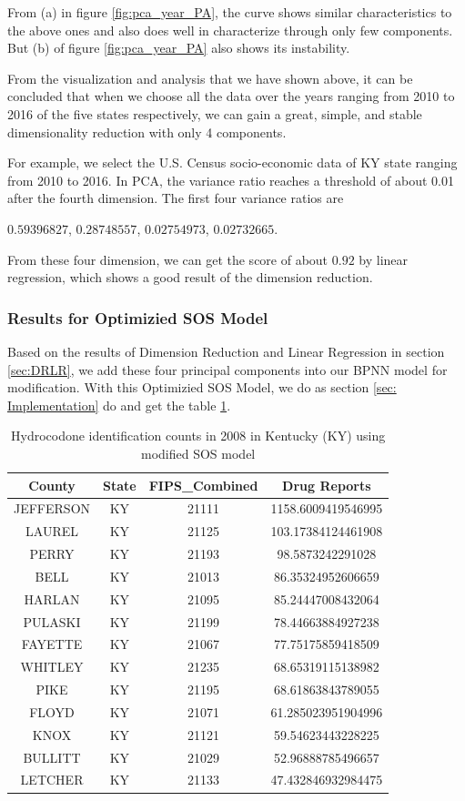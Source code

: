 \documentclass{mcmthesis}
\begin{document}
From (a) in figure \ref{fig:pca_year_PA}, the curve shows similar characteristics to the above ones and also does well in characterize through only few components. But (b) of figure \ref{fig:pca_year_PA} also shows its instability.

From the visualization and analysis that we have shown above, it can be concluded that when we choose all the data over the years ranging from 2010 to 2016 of the five states respectively, we can gain a great, simple, and stable dimensionality reduction with only 4 components.

For example, we select the U.S. Census socio-economic data of KY state ranging from 2010 to 2016. In PCA, the variance ratio reaches a threshold of about 0.01 after the fourth dimension. The first four variance ratios are 
\begin{center}
    $0.59396827$, $0.28748557$, $0.02754973$, $0.02732665$.
\end{center}

From these four dimension, we can get the score of about $0.92$ by linear regression, which shows a good result of the dimension reduction. 

\subsubsection{Results for Optimizied SOS Model}
Based on the results of Dimension Reduction and Linear Regression in section \ref{sec:DRLR}, we add these four principal components into our BPNN model for modification. With this Optimizied SOS Model, we do as section \ref{sec: Implementation} do and get the table \ref{tab:2008new}.

\begin{table}[h]
    \centering  
    \caption{Hydrocodone identification counts in 2008 in  Kentucky (KY) using modified SOS model}
    \label{tab:2008new}
    \begin{tabular}{|c|c|c|c|}
        \hline
County&State & FIPS\_Combined & Drug Reports  \\\hline
JEFFERSON&KY&21111&1158.6009419546995\\
LAUREL&KY&21125&103.17384124461908\\
PERRY&KY&21193&98.5873242291028\\
BELL&KY&21013&86.35324952606659\\
HARLAN&KY&21095&85.24447008432064\\
PULASKI&KY&21199&78.44663884927238\\
FAYETTE&KY&21067&77.75175859418509\\
WHITLEY&KY&21235&68.65319115138982\\
PIKE&KY&21195&68.61863843789055\\
FLOYD&KY&21071&61.285023951904996\\
KNOX&KY&21121&59.54623443228225\\
BULLITT&KY&21029&52.96888785496657\\
LETCHER&KY&21133&47.432846932984475\\
\hline
    \end{tabular}
\end{table} 
\end{document}
